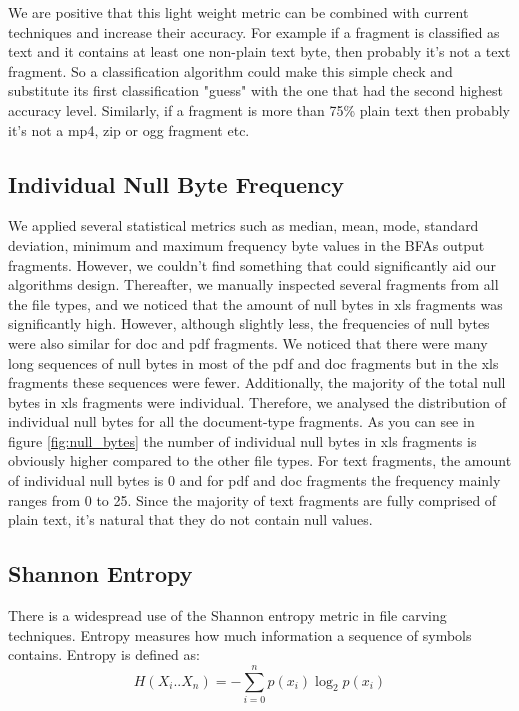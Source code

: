 We are positive that this light weight metric can be combined with current techniques and increase their accuracy. For example if a fragment is classified as text and it contains at least one non-plain text byte, then probably it's not a text fragment. So a classification algorithm could make this simple check and substitute its first classification "guess" with the one that had the second highest accuracy level. Similarly, if a fragment is more than 75\% plain text then probably it's not a mp4, zip or ogg fragment etc.

\subsection{Individual Null Byte Frequency}
We applied several statistical metrics such as median, mean, mode, standard deviation, minimum and maximum frequency byte values in the BFAs output fragments. However, we couldn't find something that could significantly aid our algorithms design. Thereafter, we manually inspected several fragments from all the file types, and we noticed that the amount of null bytes in xls fragments was significantly high. However, although slightly less, the frequencies of null bytes were also similar for doc and pdf fragments. We noticed that there were many long sequences of null bytes in most of the pdf and doc fragments but in the xls fragments these sequences were fewer. Additionally, the majority of the total null bytes in xls fragments were individual. Therefore, we analysed the distribution of individual null bytes for all the document-type fragments. As you can see in figure \ref{fig:null_bytes} the number of individual null bytes in xls fragments is obviously higher compared to the other file types. For text fragments, the amount of individual null bytes is 0 and for pdf and doc fragments the frequency mainly ranges from 0 to 25. Since the majority of text fragments are fully comprised of plain text, it's natural that they do not contain null values.





\subsection{Shannon Entropy}
There is a widespread use of the Shannon entropy\cite{Shannon} metric in file carving techniques. Entropy measures how much information a sequence of symbols contains. Entropy is defined as:
 \begin{displaymath}
 H({X_i}..{X_n})=-\sum_{i=0}^{n}{p({x_i})}\log_2{p({x_i})}
\end{displaymath} 

